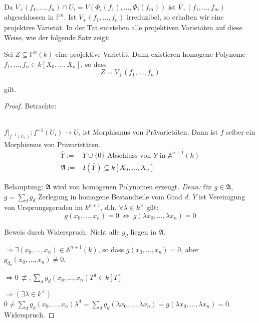 Da $V_{+}(f_{1},\ldots,f_{n})\cap U_{i}=V(\Phi_{i}(f_{1}),\ldots,\Phi_{i}(f_{m}))$
ist $V_{+}(f_{1},\ldots,f_{m})$ abgeschlossen in $\mathbb{P}^{n}$.
Ist $V_{+}(f_{1},\ldots,f_{n})$ irreduzibel, so erhalten wir eine
projektive Varietät. In der Tat entstehen alle projektiven Varietäten
auf diese Weise, wie der folgende Satz zeigt:
\begin{prop}[orig. 55]
  \label{prop:charakterisierung-projektive-varietaeten}
  Sei $Z\subseteq\mathbb{P}^{n}(k)$ eine projektive Varietät. Dann
  existieren homogene Polynome $f_{1},\ldots,f_{n}\in k[X_{0},\ldots,X_{n}]$,
  so dass
  \[
    Z=V_{+}(f_{1},\ldots,f_{n})
  \]

  gilt.
\end{prop}
\begin{proof}
  Betrachte: 
  \[
    \begin{array}{cc}
      \\
      \\
    \end{array}
  \]

  $f|_{f^{-1}(U_{i})}:f^{-1}(U_{i})\longrightarrow U_{i}$ ist Morphismus
  von Prävarietäten. Dann ist $f$ selber ein Morphismus von Prävarietäten.
  \begin{align*}
    \overline{Y}:= & Y\cup\{0\}\text{ Abschluss von }Y\text{ in }\mathbb{A}^{n+1}(k)\\
    \mathfrak{A}:= & I(\overline{Y})\subseteq k[X_{0},\ldots,X_{n}]
  \end{align*}

  Behauptung: $\mathfrak{A}$ wird von homogenen Polynomen erzeugt\emph{.
    Denn:} für $g\in\mathfrak{A}$, $g=\sum_{d}g_{d}$ Zerlegung in homogene
  Bestandteile vom Grad $d$. $\overline{Y}$ ist Vereinigung von Ursprungsgeraden
  im $k^{n+1}$, d.h. $\forall\lambda\in k^{\times}$ gilt:
  \[
    g(x_{0},\ldots,x_{n})=0\ \Leftrightarrow\ g(\lambda x_{0},\ldots,\lambda x_{n})=0
  \]

  Beweis durch Widerspruch. Nicht alle $g_{d}$ liegen in $\mathfrak{A}$.

  $\Rightarrow\exists(x_{0},\ldots,x_{n})\in\mathbb{A}^{n+1}(k)$, so
  dass $g(x_{0},\ldots,x_{n})=0$, aber $g_{d_{0}}(x_{0},\ldots,x_{n})\neq0$.

  $\Rightarrow0\,\not\equiv,\sum_{d}g_{d}(x_{0},\ldots,x_{n})T^{d}\in k[T]$

  $\Rightarrow(\exists\lambda\in k^{\times})$ $0\neq\sum_{d}g_{d}(x_{0},\ldots,x_{n})\lambda^{d}=\sum_{d}g_{d}(\lambda x_{0},\ldots,\lambda x_{n})=g(\lambda x_{0},\ldots,\lambda x_{n})=0$.
  Widerspruch.


\end{proof}

